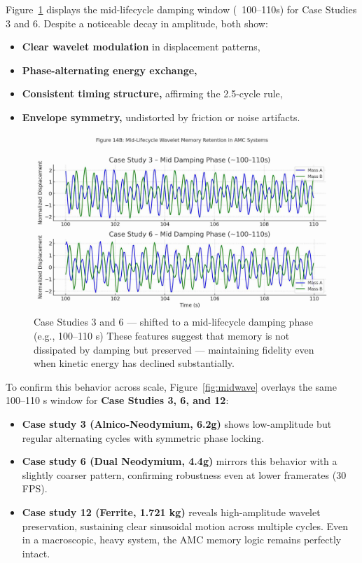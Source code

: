 \documentclass[10pt,aps,pre,onecolumn,superscriptaddress,notitlepage]{revtex4-2}
\begin{document}
Figure~\ref{fig:cs3cs6phase} displays the mid-lifecycle damping window (~100–110s) for Case Studies 3 and 6. Despite a noticeable decay in amplitude, both show:
\begin{itemize}
    \item \textbf{Clear wavelet modulation} in displacement patterns,
    \item \textbf{Phase-alternating energy exchange,}
    \item \textbf{Consistent timing structure,} affirming the 2.5-cycle rule,
    \item \textbf{Envelope symmetry,} undistorted by friction or noise artifacts.

\end{itemize}
\begin{figure}[htbp]
  \centering
  \includegraphics[width=0.8\linewidth]{figures/Figure_14B_Mid_Lifecycle_Wavelet_Memory.jpg}
  \caption{Case Studies 3 and 6 — shifted to a mid-lifecycle damping phase (e.g., 100–110 s)
These features suggest that memory is not dissipated by damping but preserved — maintaining fidelity even when kinetic energy has declined substantially.}
  \label{fig:cs3cs6phase}
\end{figure}

To confirm this behavior across scale, Figure~\ref{fig:midwave} overlays the same 100–110 s window for \textbf{Case Studies 3, 6, and 12}:

 \begin{itemize}
     \item \textbf{Case study 3 (Alnico-Neodymium, 6.2g)} shows low-amplitude but regular alternating cycles with symmetric phase locking.

     \item \textbf{Case study 6 (Dual Neodymium, 4.4g)} mirrors this behavior with a slightly coarser pattern, confirming robustness even at lower framerates (30 FPS).

     \item \textbf{Case study 12 (Ferrite, 1.721 kg)} reveals high-amplitude wavelet preservation, sustaining clear sinusoidal motion across multiple cycles. Even in a macroscopic, heavy system, the AMC memory logic remains perfectly intact.

 \end{itemize}
\end{document}
